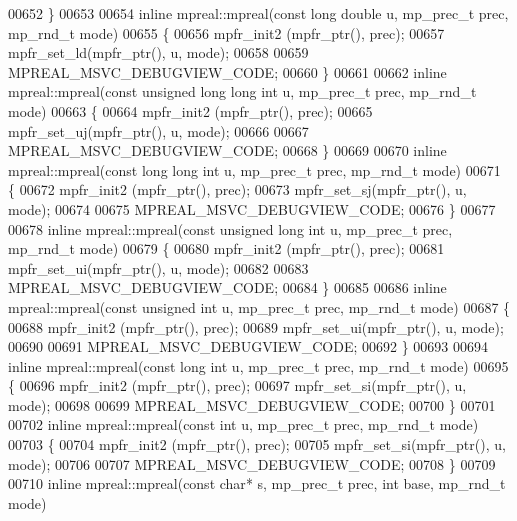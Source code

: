\begin{DoxyCode}
00652 \}
00653 
00654 \textcolor{keyword}{inline} mpreal::mpreal(\textcolor{keyword}{const} \textcolor{keywordtype}{long} \textcolor{keywordtype}{double} u, mp\_prec\_t prec, mp\_rnd\_t mode)
00655 \{
00656     mpfr\_init2 (mpfr\_ptr(), prec);
00657     mpfr\_set\_ld(mpfr\_ptr(), u, mode);
00658 
00659     MPREAL\_MSVC\_DEBUGVIEW\_CODE;
00660 \}
00661 
00662 \textcolor{keyword}{inline} mpreal::mpreal(\textcolor{keyword}{const} \textcolor{keywordtype}{unsigned} \textcolor{keywordtype}{long} \textcolor{keywordtype}{long} \textcolor{keywordtype}{int} u, mp\_prec\_t prec, mp\_rnd\_t mode)
00663 \{
00664     mpfr\_init2 (mpfr\_ptr(), prec);
00665     mpfr\_set\_uj(mpfr\_ptr(), u, mode);
00666 
00667     MPREAL\_MSVC\_DEBUGVIEW\_CODE;
00668 \}
00669 
00670 \textcolor{keyword}{inline} mpreal::mpreal(\textcolor{keyword}{const} \textcolor{keywordtype}{long} \textcolor{keywordtype}{long} \textcolor{keywordtype}{int} u, mp\_prec\_t prec, mp\_rnd\_t mode)
00671 \{
00672     mpfr\_init2 (mpfr\_ptr(), prec);
00673     mpfr\_set\_sj(mpfr\_ptr(), u, mode);
00674 
00675     MPREAL\_MSVC\_DEBUGVIEW\_CODE;
00676 \}
00677 
00678 \textcolor{keyword}{inline} mpreal::mpreal(\textcolor{keyword}{const} \textcolor{keywordtype}{unsigned} \textcolor{keywordtype}{long} \textcolor{keywordtype}{int} u, mp\_prec\_t prec, mp\_rnd\_t mode)
00679 \{
00680     mpfr\_init2 (mpfr\_ptr(), prec);
00681     mpfr\_set\_ui(mpfr\_ptr(), u, mode);
00682 
00683     MPREAL\_MSVC\_DEBUGVIEW\_CODE;
00684 \}
00685 
00686 \textcolor{keyword}{inline} mpreal::mpreal(\textcolor{keyword}{const} \textcolor{keywordtype}{unsigned} \textcolor{keywordtype}{int} u, mp\_prec\_t prec, mp\_rnd\_t mode)
00687 \{
00688     mpfr\_init2 (mpfr\_ptr(), prec);
00689     mpfr\_set\_ui(mpfr\_ptr(), u, mode);
00690 
00691     MPREAL\_MSVC\_DEBUGVIEW\_CODE;
00692 \}
00693 
00694 \textcolor{keyword}{inline} mpreal::mpreal(\textcolor{keyword}{const} \textcolor{keywordtype}{long} \textcolor{keywordtype}{int} u, mp\_prec\_t prec, mp\_rnd\_t mode)
00695 \{
00696     mpfr\_init2 (mpfr\_ptr(), prec);
00697     mpfr\_set\_si(mpfr\_ptr(), u, mode);
00698 
00699     MPREAL\_MSVC\_DEBUGVIEW\_CODE;
00700 \}
00701 
00702 \textcolor{keyword}{inline} mpreal::mpreal(\textcolor{keyword}{const} \textcolor{keywordtype}{int} u, mp\_prec\_t prec, mp\_rnd\_t mode)
00703 \{
00704     mpfr\_init2 (mpfr\_ptr(), prec);
00705     mpfr\_set\_si(mpfr\_ptr(), u, mode);
00706 
00707     MPREAL\_MSVC\_DEBUGVIEW\_CODE;
00708 \}
00709 
00710 \textcolor{keyword}{inline} mpreal::mpreal(\textcolor{keyword}{const} \textcolor{keywordtype}{char}* s, mp\_prec\_t prec, \textcolor{keywordtype}{int} base, mp\_rnd\_t mode)

\end{DoxyCode}
